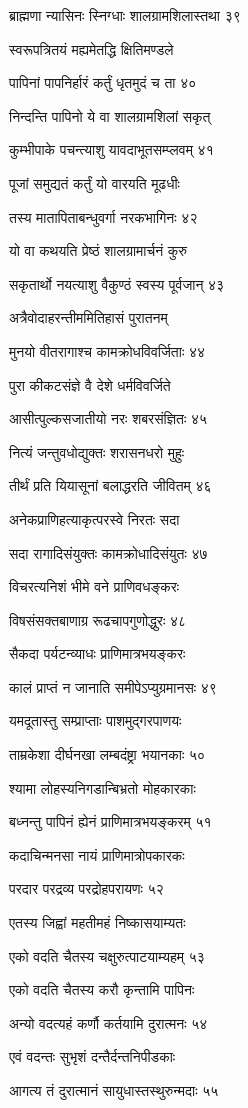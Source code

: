 ब्राह्मणा न्यासिनः स्निग्धाः शालग्रामशिलास्तथा ३९

स्वरूपत्रितयं मह्यमेतद्धि क्षितिमण्डले

पापिनां पापनिर्हारं कर्तुं धृतमुदं च ता ४०

निन्दन्ति पापिनो ये वा शालग्रामशिलां सकृत्

कुम्भीपाके पचन्त्याशु यावदाभूतसम्प्लवम् ४१

पूजां समुद्यतं कर्तुं यो वारयति मूढधीः

तस्य मातापिताबन्धुवर्गा नरकभागिनः ४२

यो वा कथयति प्रेष्ठं शालग्रामार्चनं कुरु

सकृतार्थो नयत्याशु वैकुण्ठं स्वस्य पूर्वजान् ४३

अत्रैवोदाहरन्तीममितिहासं पुरातनम्

मुनयो वीतरागाश्च कामक्रोधविवर्जिताः ४४

पुरा कीकटसंज्ञे वै देशे धर्मविवर्जिते

आसीत्पुल्कसजातीयो नरः शबरसंज्ञितः ४५

नित्यं जन्तुवधोद्युक्तः शरासनधरो मुहुः

तीर्थं प्रति यियासूनां बलाद्धरति जीवितम् ४६

अनेकप्राणिहत्याकृत्परस्वे निरतः सदा

सदा रागादिसंयुक्तः कामक्रोधादिसंयुतः ४७

विचरत्यनिशं भीमे वने प्राणिवधङ्करः

विषसंसक्तबाणाग्र रूढचापगुणोद्धुरः ४८

सैकदा पर्यटन्व्याधः प्राणिमात्रभयङ्करः

कालं प्राप्तं न जानाति समीपेऽप्युग्रमानसः ४९

यमदूतास्तु सम्प्राप्ताः पाशमुद्गरपाणयः

ताम्रकेशा दीर्घनखा लम्बदंष्ट्रा भयानकाः ५०

श्यामा लोहस्यनिगडान्बिभ्रतो मोहकारकाः

बध्नन्तु पापिनं ह्येनं प्राणिमात्रभयङ्करम् ५१

कदाचिन्मनसा नायं प्राणिमात्रोपकारकः

परदार परद्रव्य परद्रोहपरायणः ५२

एतस्य जिह्वां महतीमहं निष्कासयाम्यतः

एको वदति चैतस्य चक्षुरुत्पाटयाम्यहम् ५३

एको वदति चैतस्य करौ कृन्तामि पापिनः

अन्यो वदत्यहं कर्णौ कर्तयामि दुरात्मनः ५४

एवं वदन्तः सुभृशं दन्तैर्दन्तनिपीडकाः

आगत्य तं दुरात्मानं सायुधास्तस्थुरुन्मदाः ५५

